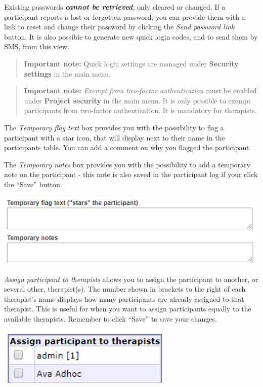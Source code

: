 \documentclass[]{book}
\begin{document}
Existing passwords \emph{\textbf{cannot be retrieved}}, only cleared or changed. If a participant reports a lost or forgotten password, you can provide them with a link to reset and change their password by clicking the \emph{Send password link} button.
It is also possible to generate new quick login codes, and to send them by SMS, from this view.

\begin{quote}
\textbf{Important note:} Quick login settings are managed under \textbf{Security settings} in the main menu.
\end{quote}

\begin{quote}
\textbf{Important note:} \emph{Exempt from two-factor authentication} must be enabled under \textbf{Project security} in the main menu. It is only possible to exempt participants from two-factor authentication. It is mandatory for therapists.
\end{quote}

The \emph{Temporary flag text} box provides you with the possibility to flag a participant with a star icon, that will display next to their name in the participants table. You can add a comment on why you flagged the participant.

The \emph{Temporary notes} box provides you with the possibility to add a temporary note on the participant - this note is also saved in the participant log if your click the ``Save'' button.

\includegraphics{images/new-images/participantTempFlagNote.png}

\emph{Assign participant to therapists} allows you to assign the participant to another, or several other, therapist(s). The number shown in brackets to the right of each therapist's name displays how many participants are already assigned to that therapist. This is useful for when you want to assign participants equally to the available therapists.
Remember to click ``Save'' to save your changes.

\includegraphics{images/new-images/participantTherapists.png}
\end{document}
